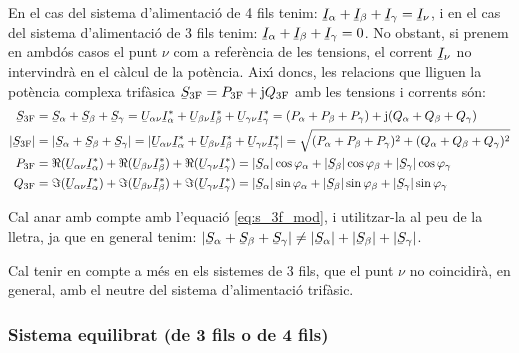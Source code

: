 En el cas del sistema d'alimentaci\'{o} de 4 fils tenim:
$\cmplx{I}_\alpha+\cmplx{I}_\beta+\cmplx{I}_\gamma=\cmplx{I}_\nu$, i
en el cas del sistema d'alimentaci\'{o} de 3 fils tenim:
$\cmplx{I}_\alpha+\cmplx{I}_\beta+\cmplx{I}_\gamma=0$. No obstant,
si prenem en ambd\'{o}s casos el punt $\nu$ com a refer\`{e}ncia de les
tensions, el corrent $\cmplx{I}_\nu$ no intervindr\`{a} en el c\`{a}lcul de
la pot\`{e}ncia. Aix\'{\i} doncs, les relacions que lliguen la pot\`{e}ncia
complexa trif\`{a}sica $\cmplx{S}\ped{3F} = P\ped{3F} + \ju Q\ped{3F}$
amb les tensions i corrents s\'{o}n:
\begin{align}
    \cmplx{S}\ped{3F} &= \cmplx{S}_\alpha + \cmplx{S}_\beta + \cmplx{S}_\gamma =
     \cmplx{U}_{\alpha\nu} \cmplx{I}_\alpha^* +
    \cmplx{U}_{\beta\nu} \cmplx{I}_\beta^* +  \cmplx{U}_{\gamma\nu} \cmplx{I}_\gamma^* =
    (P_\alpha + P_\beta + P_\gamma) + \ju (Q_\alpha + Q_\beta + Q_\gamma) \label{eq:s_3f} \\
    |\cmplx{S}\ped{3F}| &= |\cmplx{S}_\alpha + \cmplx{S}_\beta + \cmplx{S}_\gamma| =
    |\cmplx{U}_{\alpha\nu} \cmplx{I}_\alpha^* +
    \cmplx{U}_{\beta\nu} \cmplx{I}_\beta^* +  \cmplx{U}_{\gamma\nu} \cmplx{I}_\gamma^*| =
    \sqrt{(P_\alpha + P_\beta + P_\gamma)^2 + (Q_\alpha + Q_\beta + Q_\gamma)^2} \label{eq:s_3f_mod} \\
    P\ped{3F} &= \Re(\cmplx{U}_{\alpha\nu} \cmplx{I}_\alpha^*) +
    \Re(\cmplx{U}_{\beta\nu} \cmplx{I}_\beta^*) +  \Re(\cmplx{U}_{\gamma\nu}
    \cmplx{I}_\gamma^*) = |\cmplx{S}_\alpha| \cos \varphi_\alpha + |\cmplx{S}_\beta| \cos
    \varphi_\beta + |\cmplx{S}_\gamma| \cos \varphi_\gamma \\
    Q\ped{3F} &= \Im(\cmplx{U}_{\alpha\nu} \cmplx{I}_\alpha^*) +
    \Im(\cmplx{U}_{\beta\nu} \cmplx{I}_\beta^*) +  \Im(\cmplx{U}_{\gamma\nu}
    \cmplx{I}_\gamma^*) = |\cmplx{S}_\alpha| \sin \varphi_\alpha + |\cmplx{S}_\beta| \sin
    \varphi_\beta + |\cmplx{S}_\gamma| \sin \varphi_\gamma
\end{align}

Cal anar amb compte amb l'equaci\'{o} \eqref{eq:s_3f_mod}, i utilitzar-la al
peu de la lletra, ja
que en general tenim: $|\cmplx{S}_\alpha + \cmplx{S}_\beta + \cmplx{S}_\gamma| \neq
|\cmplx{S}_\alpha| + |\cmplx{S}_\beta| + |\cmplx{S}_\gamma|$.

Cal tenir en compte a m\'{e}s en els sistemes de 3 fils, que el punt
$\nu$ no coincidir\`{a}, en general, amb el neutre del sistema
d'alimentaci\'{o} trif\`{a}sic.

\subsubsection{Sistema equilibrat (de 3 fils o de 4 fils)}

